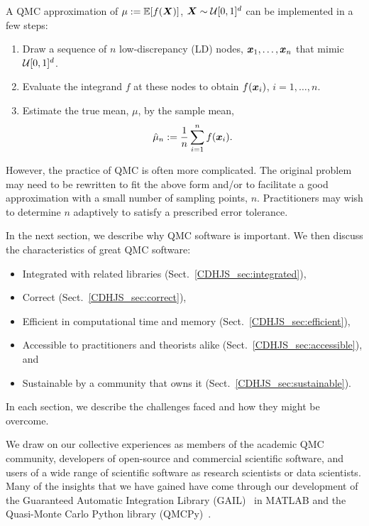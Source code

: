 \documentclass[graybox]{svmult}
\begin{document}
A QMC approximation of $\mu := {\mathbb{E}}[f({\boldsymbol{X}})]$, ${\boldsymbol{X}} \sim {\mathcal{U}}[0,1]^d$ can be implemented in a few steps:
\begin{enumerate}
    \item Draw a sequence of $n$ low-discrepancy (LD) \cite{Nie92, SloJoe94, DicEtal14a, DicEtal22a} nodes,
    ${\boldsymbol{x}}_1,\dots,{\boldsymbol{x}}_n$ that mimic ${\mathcal{U}}[0,1]^d$.
    \item Evaluate the integrand $f$ at these nodes to obtain $f({\boldsymbol{x}}_i)$, $i=1,\dots,n$.
    \item Estimate the true mean, $\mu$, by the sample mean,
    \begin{equation}
        \hat{\mu}_n := \frac{1}{n} \sum_{i=1}^n f(\bsx_i).
        \label{eq:mc_average}
    \end{equation}
\end{enumerate}
However, the practice of QMC is often more complicated.  The original problem may need to be rewritten to fit the above form and/or to facilitate a good approximation with a small number of sampling points, $n$.  Practitioners may wish to determine $n$ adaptively to satisfy a prescribed error tolerance.

In the next section, we describe why QMC software is important.  We then discuss the characteristics of great QMC software:

\begin{itemize}
\item Integrated with related libraries (Sect.\ \ref{CDHJS_sec:integrated}),

\item Correct (Sect.\ \ref{CDHJS_sec:correct}),

\item Efficient in computational time and memory (Sect.\ \ref{CDHJS_sec:efficient}),

\item Accessible to practitioners and theorists alike (Sect.\ \ref{CDHJS_sec:accessible}), and

\item Sustainable by a community that owns it (Sect.\ \ref{CDHJS_sec:sustainable}).

\end{itemize}
In each section, we describe the challenges faced and how they might be overcome.

We draw on our collective experiences as
members of the academic QMC community, developers of open-source and commercial scientific software, and users of a wide range of scientific software as research scientists or data scientists. Many of the insights that we have gained have come through our development of the Guaranteed Automatic Integration Library (GAIL)~\cite{TonEtAl22a} in MATLAB and the Quasi-Monte Carlo Python library (QMCPy)~\cite{QMCPy2020a}.
\end{document}
